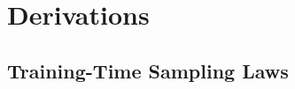 \appendix{}

\chapter{Derivations}\label{app:derivations}

\section{Training-Time Sampling Laws}\label{app:training-time-laws}

